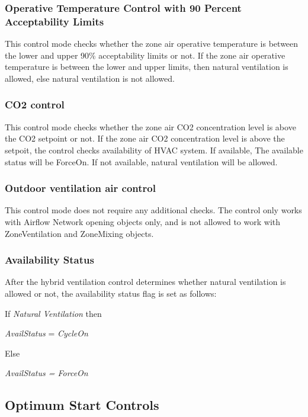 \subsubsection{Operative Temperature Control with 90 Percent Acceptability Limits}\label{operative-temperature-control-with-90-acceptability-limits}

 This control mode checks whether the zone air operative temperature is between the lower and upper 90\% acceptability limits or not. If the zone air operative temperature is between the lower and upper limits, then natural ventilation is allowed, else natural ventilation is not allowed. 

\subsubsection{CO2 control}\label{co2-control} 

 This control mode checks whether the zone air CO2 concentration level is above the CO2 setpoint or not. If the zone air CO2 concentration level is above the setpoit, the control checks availability of HVAC system. If available, The available status will be ForceOn. If not available, natural ventilation will be allowed. 

\subsubsection{Outdoor ventilation air control}\label{outdoor-ventilation-air-control}

This control mode does not require any additional checks. The control only works with Airflow Network opening objects only, and is not allowed to work with ZoneVentilation and ZoneMixing objects.

\subsubsection{Availability Status}\label{availability-status}

After the hybrid ventilation control determines whether natural ventilation is allowed or not, the availability status flag is set as follows:

If \emph{Natural Ventilation} then

\emph{AvailStatus} = \emph{CycleOn}

Else

\emph{AvailStatus = ForceOn}

\subsection{\textbf{Optimum Start Controls}}\label{optimum-start-controls}

